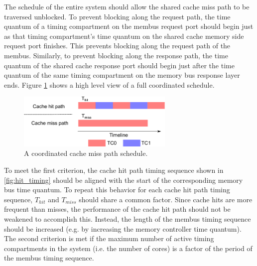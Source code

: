 The schedule of the entire system should allow the shared cache miss path to be 
traversed unblocked.
To prevent blocking along the request path, the time quantum of a timing 
compartment on the membus request port should begin just as that timing 
compartment's time quantum on the shared cache memory side request port 
finishes. This prevents blocking along the request path of the membus.
Similarly, to prevent blocking along the response path, the time quantum of the 
shared cache response port should begin just after the time quantum of the same 
timing compartment on the memory bus response layer ends. Figure 
\ref{fig:coordination}
shows a high level view of a full coordinated schedule.

\begin{figure}
    \begin{center}
        \includegraphics[width=2.9475in]{figs/coordination.pdf}
        \caption{A coordinated cache miss path schedule.}
        \label{fig:coordination}
    \end{center}
\end{figure}

To meet the first criterion, the cache hit path timing sequence shown in 
\ref{fig:hit_timing} should be aligned with the start of the corresponding 
memory bus time quantum. To repeat this behavior for each cache hit path timing 
sequence, $T_{hit}$ and $T_{miss}$
should share a common factor. Since cache hits are more frequent than misses, 
the performance of the cache hit path should not be weakened to accomplish 
this. Instead, the length of the membus timing sequence should be increased 
(e.g. by increasing the memory controller time quantum). The second criterion 
is met if the maximum number of active timing compartments in the system (i.e.  
the number of cores) is a factor of the period of the membus timing sequence.
